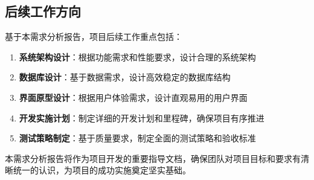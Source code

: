 \documentclass[a4paper]{article}
\begin{document}
\subsection{后续工作方向}

基于本需求分析报告，项目后续工作重点包括：

\begin{enumerate}
    \item \textbf{系统架构设计}：根据功能需求和性能要求，设计合理的系统架构
    \item \textbf{数据库设计}：基于数据需求，设计高效稳定的数据库结构
    \item \textbf{界面原型设计}：根据用户体验需求，设计直观易用的用户界面
    \item \textbf{开发实施计划}：制定详细的开发计划和里程碑，确保项目有序推进
    \item \textbf{测试策略制定}：基于质量要求，制定全面的测试策略和验收标准
\end{enumerate}

本需求分析报告将作为项目开发的重要指导文档，确保团队对项目目标和要求有清晰统一的认识，为项目的成功实施奠定坚实基础。
\end{document}
